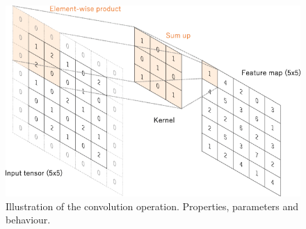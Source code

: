 \begin{figure}[h]
    \centering
    \includegraphics[width=\textwidth]{fig/rel/images/conv_not_proper.png}
    \caption{Illustration of the convolution operation. Properties, parameters and behaviour.}
    \label{fig:conv_local}
\end{figure}